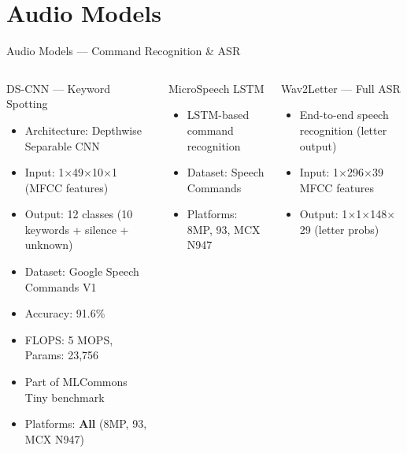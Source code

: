 \documentclass[aspectratio=169]{beamer}
\begin{document}
\section{Audio Models}

\begin{frame}{Audio Models — Command Recognition \& ASR}
  \begin{columns}[T]
      \begin{block}{DS-CNN — Keyword Spotting}
        \begin{itemize}\scriptsize
          \item Architecture: Depthwise Separable CNN
          \item Input: 1$\times$49$\times$10$\times$1 (MFCC features)
          \item Output: 12 classes (10 keywords + silence + unknown)
          \item Dataset: Google Speech Commands V1
          \item Accuracy: \alert{91.6\%}
          \item FLOPS: \alert{5 MOPS}, Params: \alert{23,756}
          \item Part of MLCommons Tiny benchmark
          \item Platforms: \textbf{All} (8MP, 93, MCX N947)
        \end{itemize}
      \end{block}
      \vspace{4pt}
      \begin{block}{MicroSpeech LSTM}
        \begin{itemize}\scriptsize
          \item LSTM-based command recognition
          \item Dataset: Speech Commands
          \item Platforms: 8MP, 93, MCX N947
        \end{itemize}
      \end{block}
      \begin{block}{Wav2Letter — Full ASR}
        \begin{itemize}\scriptsize
          \item End-to-end speech recognition (letter output)
          \item Input: 1$\times$296$\times$39 MFCC features
          \item Output: 1$\times$1$\times$148$\times$29 (letter probs)

\end{itemize}
\end{block}
\end{columns}
\end{frame}
\end{document}
